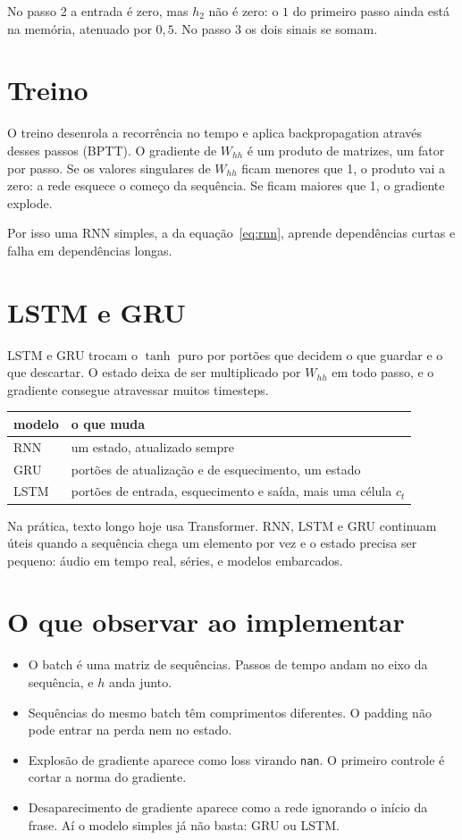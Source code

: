 \documentclass[11pt]{article}
\begin{document}
No passo 2 a entrada é zero, mas \(h_2\) não é zero: o \(1\) do primeiro passo ainda está na memória, atenuado por \(0{,}5\). No passo 3 os dois sinais se somam.

\section{Treino}

O treino desenrola a recorrência no tempo e aplica backpropagation através desses passos (BPTT). O gradiente de \(W_{hh}\) é um produto de matrizes, um fator por passo. Se os valores singulares de \(W_{hh}\) ficam menores que 1, o produto vai a zero: a rede esquece o começo da sequência. Se ficam maiores que 1, o gradiente explode.

Por isso uma RNN simples, a da equação~\eqref{eq:rnn}, aprende dependências curtas e falha em dependências longas.

\section{LSTM e GRU}

LSTM e GRU trocam o \(\tanh\) puro por portões que decidem o que guardar e o que descartar. O estado deixa de ser multiplicado por \(W_{hh}\) em todo passo, e o gradiente consegue atravessar muitos timesteps.

\begin{center}
\begin{tabular}{ll}
  \toprule
  modelo & o que muda \\
  \midrule
  RNN & um estado, atualizado sempre \\
  GRU & portões de atualização e de esquecimento, um estado \\
  LSTM & portões de entrada, esquecimento e saída, mais uma célula \(c_t\) \\
  \bottomrule
\end{tabular}
\end{center}

Na prática, texto longo hoje usa Transformer. RNN, LSTM e GRU continuam úteis quando a sequência chega um elemento por vez e o estado precisa ser pequeno: áudio em tempo real, séries, e modelos embarcados.

\section{O que observar ao implementar}

\begin{itemize}
  \item O batch é uma matriz de sequências. Passos de tempo andam no eixo da sequência, e \(h\) anda junto.
  \item Sequências do mesmo batch têm comprimentos diferentes. O padding não pode entrar na perda nem no estado.
  \item Explosão de gradiente aparece como loss virando \texttt{nan}. O primeiro controle é cortar a norma do gradiente.
  \item Desaparecimento de gradiente aparece como a rede ignorando o início da frase. Aí o modelo simples já não basta: GRU ou LSTM.
\end{itemize}
\end{document}
